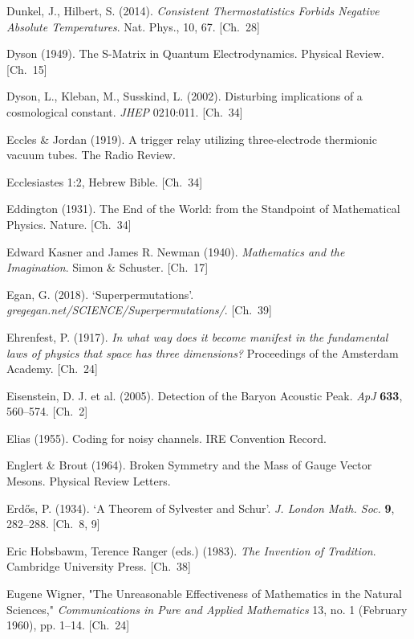 \begin{list}{}{%
  \setlength{\leftmargin}{2em}%
  \setlength{\itemindent}{-2em}%
  \setlength{\itemsep}{0.35\baselineskip}%
  \setlength{\parsep}{0pt}%
  \setlength{\topsep}{0.5em}}
\item Dunkel, J., Hilbert, S. (2014). \textit{Consistent Thermostatistics Forbids Negative Absolute Temperatures}. Nat. Phys., 10, 67. \hfill {\scriptsize [Ch.~28]}
\item Dyson (1949). The S-Matrix in Quantum Electrodynamics. Physical Review. \hfill {\scriptsize [Ch.~15]}
\item Dyson, L., Kleban, M., Susskind, L. (2002). Disturbing implications of a cosmological constant. \textit{JHEP} 0210:011. \hfill {\scriptsize [Ch.~34]}
\item Eccles \& Jordan (1919). A trigger relay utilizing three-electrode thermionic vacuum tubes. The Radio Review.
\item Ecclesiastes 1:2, Hebrew Bible. \hfill {\scriptsize [Ch.~34]}
\item Eddington (1931). The End of the World: from the Standpoint of Mathematical Physics. Nature. \hfill {\scriptsize [Ch.~34]}
\item Edward Kasner and James R. Newman (1940). \textit{Mathematics and the Imagination}. Simon \& Schuster. \hfill {\scriptsize [Ch.~17]}
\item Egan, G. (2018). `Superpermutations'. \textit{gregegan.net/SCIENCE/Superpermutations/}. \hfill {\scriptsize [Ch.~39]}
\item Ehrenfest, P. (1917). \textit{In what way does it become manifest in the fundamental laws of physics that space has three dimensions?} Proceedings of the Amsterdam Academy. \hfill {\scriptsize [Ch.~24]}
\item Eisenstein, D. J. et al. (2005). Detection of the Baryon Acoustic Peak. \textit{ApJ} \textbf{633}, 560–574. \hfill {\scriptsize [Ch.~2]}
\item Elias (1955). Coding for noisy channels. IRE Convention Record.
\item Englert \& Brout (1964). Broken Symmetry and the Mass of Gauge Vector Mesons. Physical Review Letters.
\item Erdős, P. (1934). `A Theorem of Sylvester and Schur'. \textit{J. London Math. Soc.} \textbf{9}, 282–288. \hfill {\scriptsize [Ch.~8, 9]}
\item Eric Hobsbawm, Terence Ranger (eds.) (1983). \textit{The Invention of Tradition}. Cambridge University Press. \hfill {\scriptsize [Ch.~38]}
\item Eugene Wigner, "The Unreasonable Effectiveness of Mathematics in the Natural Sciences," \textit{Communications in Pure and Applied Mathematics} 13, no. 1 (February 1960), pp. 1–14. \hfill {\scriptsize [Ch.~24]}

\end{list}
